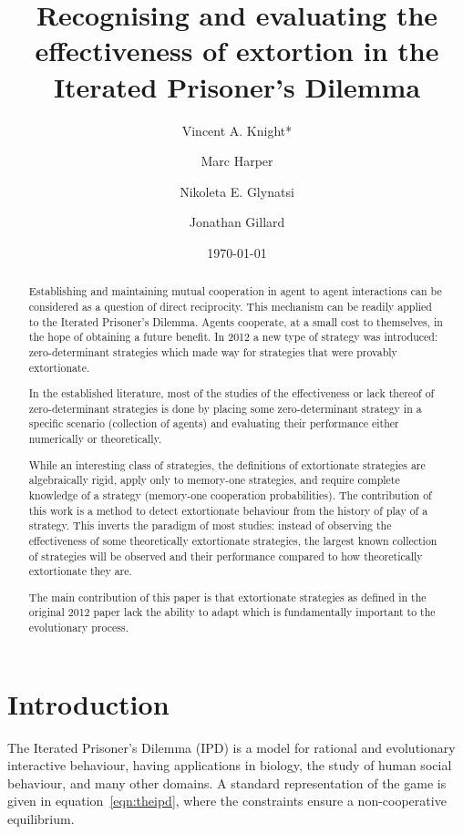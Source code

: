 \documentclass[a4paper]{article}
\title{Recognising and evaluating the effectiveness
       of extortion in the Iterated Prisoner's Dilemma}
\author[1]{Vincent A. Knight*}
\author[2]{Marc Harper}
\author[1]{Nikoleta E. Glynatsi}
\author[1]{Jonathan Gillard}
\affil[1]{Cardiff University, School of Mathematics, Cardiff, United Kingdom}
\affil[2]{Google Inc., Mountain View, CA, United States of America}
\date{\today}
\begin{document}
\maketitle

\begin{abstract}

Establishing and maintaining mutual cooperation in agent to agent interactions
can be considered as a question of direct reciprocity. This mechanism can be
readily applied to the Iterated Prisoner's Dilemma. Agents cooperate, at a
small cost to themselves, in the hope of obtaining a future benefit. In 2012
a new type of strategy was introduced: zero-determinant strategies which
made way for strategies that were provably extortionate.

In the established literature, most of the studies of the effectiveness or lack
thereof of zero-determinant strategies is done by placing some
zero-determinant strategy in a specific scenario (collection of agents) and
evaluating their performance either numerically or theoretically.

While an interesting class of strategies, the definitions of extortionate
strategies are algebraically rigid, apply only to memory-one strategies, and
require complete knowledge of a strategy (memory-one cooperation
probabilities). The contribution of this work is a method to detect
extortionate behaviour from the history of play of a strategy. This inverts
the paradigm of most studies: instead of observing the effectiveness of some
theoretically extortionate strategies, the largest known collection of
strategies will be observed and their performance compared to how
theoretically extortionate they are.

The main contribution of this paper is that extortionate strategies as defined
in the original 2012 paper lack the ability to adapt which is fundamentally
important to the evolutionary process.
\end{abstract}

\section{Introduction}

The Iterated Prisoner's Dilemma (IPD) is a model for rational and evolutionary
interactive behaviour, having applications in biology, the study of human social
behaviour, and many other domains. A standard representation  of the game is
given in equation~\ref{eqn:theipd}, where the constraints ensure a
non-cooperative equilibrium.
\end{document}
